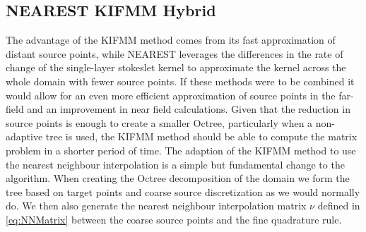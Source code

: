 \FloatBarrier

\subsection{NEAREST KIFMM Hybrid} \label{sec:Hybrid}
The advantage of the KIFMM method comes from its fast approximation of distant source points, while NEAREST leverages the differences in the rate of change of the single-layer stokeslet kernel to approximate the kernel across the whole domain with fewer source points. If these methods were to be combined it would allow for an even more efficient approximation of source points in the far-field and an improvement in near field calculations. Given that the reduction in source points is enough to create a smaller Octree, particularly when a non-adaptive tree is used, the KIFMM method should be able to compute the matrix problem in a shorter period of time. The adaption of the KIFMM method to use the nearest neighbour interpolation is a simple but fundamental change to the algorithm. When creating the Octree decomposition of the domain we form the tree based on target points and coarse source discretization as we would normally do. We then also generate the nearest neighbour interpolation matrix $\nu$ defined in \cref{eq:NNMatrix} between the coarse source points and the fine quadrature rule.  

